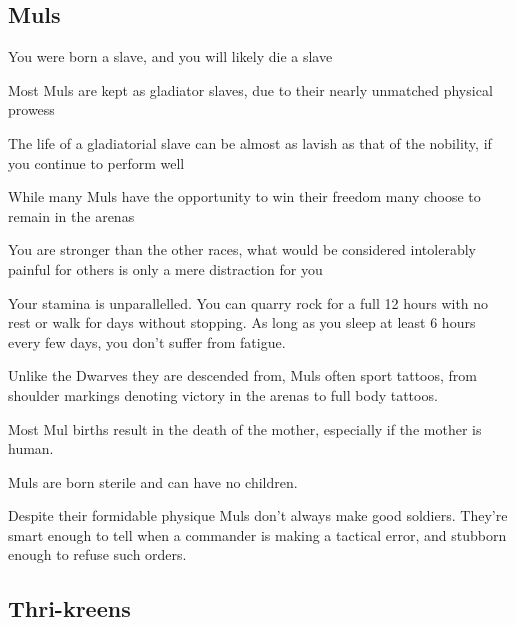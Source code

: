 \subsection{Muls}

\begin{description}
    \item You were born a slave, and you will likely die a slave
    \item Most Muls are kept as gladiator slaves, due to their nearly unmatched physical prowess
    \item The life of a gladiatorial slave can be almost as lavish as that of the nobility, if you continue to perform well
    \item While many Muls have the opportunity to win their freedom many choose to remain in the arenas
    \item You are stronger than the other races, what would be considered intolerably painful for others is only a mere distraction for you
    \item Your stamina is unparallelled. You can quarry rock for a full 12 hours with no rest or walk for days without stopping. As long as you sleep at least 6 hours every few days, you don’t suffer from fatigue.
    \item Unlike the Dwarves they are descended from, Muls often sport tattoos, from shoulder markings denoting victory in the arenas to full body tattoos.
    \item Most Mul births result in the death of the mother, especially if the mother is human.
    \item Muls are born sterile and can have no children.
    \item Despite their formidable physique Muls don’t always make good soldiers. They’re smart enough to tell when a commander is making a tactical error, and stubborn enough to refuse such orders.
\end{description}

\subsection{Thri-kreens}

